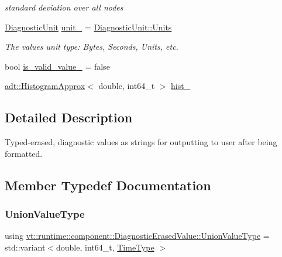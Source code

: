 \begin{DoxyCompactItemize}
\begin{DoxyCompactList}\small\item\em standard deviation over all nodes \end{DoxyCompactList}\item 
\hyperlink{namespacevt_1_1runtime_1_1component_a99ec18b08862c712176126bb7d0e307a}{Diagnostic\+Unit} \hyperlink{structvt_1_1runtime_1_1component_1_1_diagnostic_erased_value_aa43354cc162d6edaae48f878a6d874d1}{unit\+\_\+} = \hyperlink{namespacevt_1_1runtime_1_1component_a99ec18b08862c712176126bb7d0e307aae5771a362d88a71a657bfcd21ca54b3f}{Diagnostic\+Unit\+::\+Units}
\begin{DoxyCompactList}\small\item\em The value\textquotesingle{}s unit type\+: Bytes, Seconds, Units, etc. \end{DoxyCompactList}\item 
bool \hyperlink{structvt_1_1runtime_1_1component_1_1_diagnostic_erased_value_a1d9282d6e63f35b926953d6403865339}{is\+\_\+valid\+\_\+value\+\_\+} = false
\item 
\hyperlink{namespacevt_1_1adt_a486971e142bc22434d6afe695c43b599}{adt\+::\+Histogram\+Approx}$<$ double, int64\+\_\+t $>$ \hyperlink{structvt_1_1runtime_1_1component_1_1_diagnostic_erased_value_aae13ce0e05e55ba2d341d3fdcdda899c}{hist\+\_\+}
\end{DoxyCompactItemize}


\subsection{Detailed Description}
Typed-\/erased, diagnostic values as strings for outputting to user after being formatted. 

\subsection{Member Typedef Documentation}
\mbox{\label{structvt_1_1runtime_1_1component_1_1_diagnostic_erased_value_a92484d3d64af3428f02087686271299b}} 
\subsubsection{\texorpdfstring{Union\+Value\+Type}{UnionValueType}}
{\footnotesize\ttfamily using \hyperlink{structvt_1_1runtime_1_1component_1_1_diagnostic_erased_value_a92484d3d64af3428f02087686271299b}{vt\+::runtime\+::component\+::\+Diagnostic\+Erased\+Value\+::\+Union\+Value\+Type} =  std\+::variant$<$double, int64\+\_\+t, \hyperlink{namespacevt_a2b9f28078dc309ad0706b69ded743e69}{Time\+Type} $>$}

